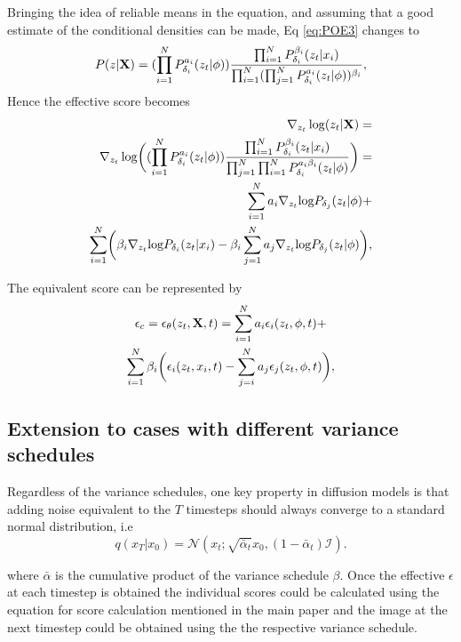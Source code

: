 \documentclass[10pt,twocolumn,letterpaper]{article}
\begin{document}
Bringing the idea of reliable means in the equation, and assuming that a good estimate of the conditional densities can be made, Eq \ref{eq:POE3} changes to
\begin{equation}
    P(z|{\bf{X}})
    = (\prod_{i=1}^{N}P_{\delta_i}^{a_i}(z_t|\phi))\frac{\prod_{i=1}^{N}P_{\delta_i}^{\beta_i}(z_t|x_i)}{\prod_{i=1}^{N}(\prod_{j=1}^{N}P_{\delta_i}^{a_i}(z_t|\phi))^{\beta_i}},
    \label{eq:POE4}
\end{equation}
Hence the effective score becomes 
 \begin{equation}
\begin{split}
 \nabla_{z_t}\log  (z_t|{\bf{X}}) =   \\
\nabla_{z_t}\log  \biggl((\prod_{i=1}^{N}P_{\delta_i}^{a_i}(z_t|\phi))\frac{\prod_{i=1}^{N}P_{\delta_i}^{\beta_i}(z_t|x_i)}{\prod_{j=1}^{N}\prod_{i=1}^{N}P_{\delta_i}^{a_i\beta_i}(z_t|\phi)} \biggr)=\\ \sum_{i=1}^N  a_i \nabla_{z_t}\text{log}  P_{\delta_j}(z_t|\phi)+\\
     \sum_{i=1}^N \biggl( \beta_i\nabla_{z_t}\text{log} P_{\delta_i}(z_t|x_i) - \beta_i\sum_{j=1}^Na_j \nabla_{z_t}\text{log}  P_{\delta_j}(z_t|\phi)\biggr),
\end{split}
\end{equation}

The equivalent score can be represented by 
\begin{multline}
   \epsilon_{c}= \epsilon_{\theta}(z_t,{\bf{X}} ,t) =\sum_{i=1}^N a_i \epsilon_{i}(z_t,\phi,t) +\\
   \sum_{i=1}^N\beta_i\biggl( \epsilon_{i}(z_t,x_i,t)-
   \sum_{j=i}^N a_{j}\epsilon_j (z_t,\phi,t)\biggr),
   \label{eq:multimodal2}
\end{multline}
\subsection{Extension to cases with different variance schedules}
Regardless of the variance schedules, one key property in diffusion models is that adding noise equivalent to the $T$ timesteps should always converge to a standard normal distribution, i.e
\begin{equation}
    q(x_T|x_{0}) = \mathcal{N}(x_t; \sqrt{\bar{\alpha}_t} x_0, (1-\bar{\alpha}_t) \mathcal{I}).
    \label{eq:q_sample0}
\end{equation}

where $\bar{\alpha}$ is the cumulative product of the variance schedule $\beta$. Once the effective $\epsilon$ at each timestep is obtained the individual scores could be calculated using the equation for score calculation mentioned in the main paper and the image at the next timestep could be obtained using the the respective variance schedule.
\end{document}
